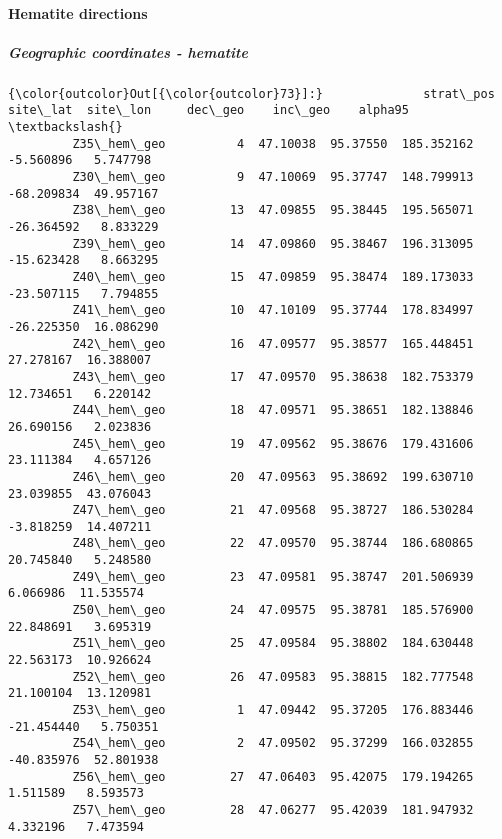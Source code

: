 \documentclass[11pt]{article}
\begin{document}
    \paragraph{Hematite directions}\label{hematite-directions}

    \subparagraph{Geographic coordinates -
hematite}\label{geographic-coordinates---hematite}


            \begin{Verbatim}[commandchars=\\\{\}]
{\color{outcolor}Out[{\color{outcolor}73}]:}              strat\_pos  site\_lat  site\_lon     dec\_geo    inc\_geo    alpha95  \textbackslash{}
         Z35\_hem\_geo          4  47.10038  95.37550  185.352162  -5.560896   5.747798   
         Z30\_hem\_geo          9  47.10069  95.37747  148.799913 -68.209834  49.957167   
         Z38\_hem\_geo         13  47.09855  95.38445  195.565071 -26.364592   8.833229   
         Z39\_hem\_geo         14  47.09860  95.38467  196.313095 -15.623428   8.663295   
         Z40\_hem\_geo         15  47.09859  95.38474  189.173033 -23.507115   7.794855   
         Z41\_hem\_geo         10  47.10109  95.37744  178.834997 -26.225350  16.086290   
         Z42\_hem\_geo         16  47.09577  95.38577  165.448451  27.278167  16.388007   
         Z43\_hem\_geo         17  47.09570  95.38638  182.753379  12.734651   6.220142   
         Z44\_hem\_geo         18  47.09571  95.38651  182.138846  26.690156   2.023836   
         Z45\_hem\_geo         19  47.09562  95.38676  179.431606  23.111384   4.657126   
         Z46\_hem\_geo         20  47.09563  95.38692  199.630710  23.039855  43.076043   
         Z47\_hem\_geo         21  47.09568  95.38727  186.530284  -3.818259  14.407211   
         Z48\_hem\_geo         22  47.09570  95.38744  186.680865  20.745840   5.248580   
         Z49\_hem\_geo         23  47.09581  95.38747  201.506939   6.066986  11.535574   
         Z50\_hem\_geo         24  47.09575  95.38781  185.576900  22.848691   3.695319   
         Z51\_hem\_geo         25  47.09584  95.38802  184.630448  22.563173  10.926624   
         Z52\_hem\_geo         26  47.09583  95.38815  182.777548  21.100104  13.120981   
         Z53\_hem\_geo          1  47.09442  95.37205  176.883446 -21.454440   5.750351   
         Z54\_hem\_geo          2  47.09502  95.37299  166.032855 -40.835976  52.801938   
         Z56\_hem\_geo         27  47.06403  95.42075  179.194265   1.511589   8.593573   
         Z57\_hem\_geo         28  47.06277  95.42039  181.947932   4.332196   7.473594   
         

\end{Verbatim}
\end{document}
